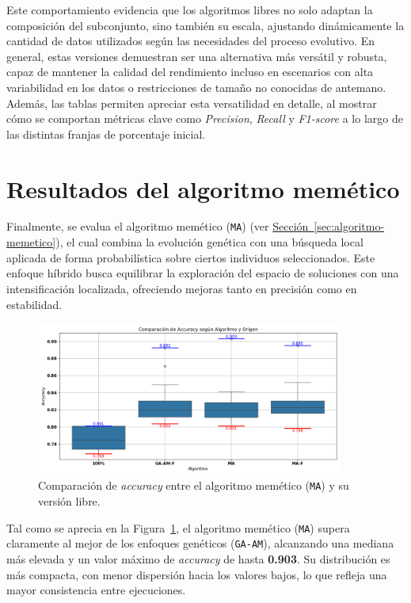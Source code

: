 Este comportamiento evidencia que los algoritmos libres no solo adaptan la composición del subconjunto, sino también su escala,
ajustando dinámicamente la cantidad de datos utilizados según las necesidades del proceso evolutivo.
En general, estas versiones demuestran ser una alternativa más versátil y robusta,
capaz de mantener la calidad del rendimiento incluso en escenarios con alta variabilidad en los datos o restricciones de tamaño no conocidas de antemano.
Además, las tablas permiten apreciar esta versatilidad en detalle, al mostrar cómo se comportan métricas clave como \textit{Precision},
\textit{Recall} y \textit{F1-score} a lo largo de las distintas franjas de porcentaje inicial.


\section{Resultados del algoritmo memético}\label{sec:resultados-algoritmo-memetico}
Finalmente, se evalua el algoritmo memético (\texttt{MA}) (ver \hyperref[sec:algoritmo-memetico]{Sección~\ref*{sec:algoritmo-memetico}}),
el cual combina la evolución genética con una búsqueda local aplicada de forma probabilística sobre ciertos individuos seleccionados.
Este enfoque híbrido busca equilibrar la exploración del espacio de soluciones con una intensificación localizada,
ofreciendo mejoras tanto en precisión como en estabilidad.


\begin{figure}[htp]
  \centering
  \includegraphics[width=0.9\textwidth]{imagenes/evaluaciones/comparacion-ma.png}
  \caption{Comparación de \textit{accuracy} entre el algoritmo memético (\texttt{MA}) y su versión libre.}
  \label{fig:memetico_comparacion}
\end{figure}

Tal como se aprecia en la Figura~\ref{fig:memetico_comparacion}, el algoritmo memético (\texttt{MA}) supera claramente al mejor de los enfoques genéticos
(\texttt{GA-AM}), alcanzando una mediana más elevada y un valor máximo de \textit{accuracy} de hasta \textbf{0.903}.
Su distribución es más compacta, con menor dispersión hacia los valores bajos, lo que refleja una mayor consistencia entre ejecuciones.

